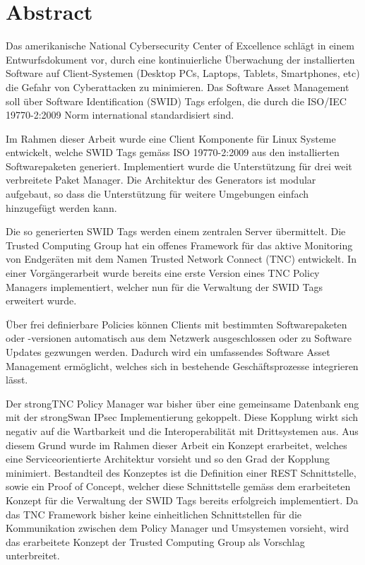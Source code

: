 \chapter{Abstract}

Das amerikanische National Cybersecurity Center of Excellence schlägt in einem
Entwurfsdokument vor, durch eine kontinuierliche Überwachung der installierten
Software auf Client-Systemen (Desktop PCs, Laptops, Tablets, Smartphones, etc)
die Gefahr von Cyberattacken zu minimieren. Das Software Asset Management soll
über Software Identification (SWID) Tags erfolgen, die durch die ISO/IEC
19770-2:2009 Norm international standardisiert sind.

Im Rahmen dieser Arbeit wurde eine Client Komponente für Linux Systeme
entwickelt, welche SWID Tags gemäss ISO 19770-2:2009 aus den installierten
Softwarepaketen generiert. Implementiert wurde die Unterstützung für drei weit
verbreitete Paket Manager. Die Architektur des Generators ist modular aufgebaut,
so dass die Unterstützung für weitere Umgebungen einfach hinzugefügt werden
kann.

Die so generierten SWID Tags werden einem zentralen Server übermittelt. Die
Trusted Computing Group hat ein offenes Framework für das aktive Monitoring von
Endgeräten mit dem Namen Trusted Network Connect (TNC) entwickelt. In einer
Vorgängerarbeit wurde bereits eine erste Version eines TNC Policy Managers
implementiert, welcher nun für die Verwaltung der SWID Tags erweitert wurde.

Über frei definierbare Policies können Clients mit bestimmten Softwarepaketen
oder -versionen automatisch aus dem Netzwerk ausgeschlossen oder zu Software
Updates gezwungen werden. Dadurch wird ein umfassendes Software Asset Management
ermöglicht, welches sich in bestehende Geschäftsprozesse integrieren lässt.

Der strongTNC Policy Manager war bisher über eine gemeinsame Datenbank eng mit
der strongSwan IPsec Implementierung gekoppelt. Diese Kopplung wirkt sich
negativ auf die Wartbarkeit und die Interoperabilität mit Drittsystemen aus. Aus
diesem Grund wurde im Rahmen dieser Arbeit ein Konzept erarbeitet, welches eine
Serviceorientierte Architektur vorsieht und so den Grad der Kopplung minimiert.
Bestandteil des Konzeptes ist die Definition einer REST Schnittstelle, sowie ein
Proof of Concept, welcher diese Schnittstelle gemäss dem erarbeiteten Konzept für die
Verwaltung der SWID Tags bereits erfolgreich implementiert. Da das TNC Framework
bisher keine einheitlichen Schnittstellen für die Kommunikation zwischen dem
Policy Manager und Umsystemen vorsieht, wird das erarbeitete Konzept der Trusted
Computing Group als Vorschlag unterbreitet.
